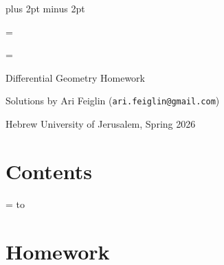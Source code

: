 




\parindent=0pt
\parskip=3pt plus 2pt minus 2pt



\footline={}


\headline={\pagedecor}

{\setboxshadow
\contentbox

    \centerline{Differential Geometry Homework}
    \smallskip
    \centerline{Solutions by Ari Feiglin ({\tt ari.feiglin@gmail.com})}
    \centerline{Hebrew University of Jerusalem, Spring 2026}

\eppbox

\bigskip

\contentbox
    \section*{Contents}
    
    \tableofcontents
\eppbox

}

\vfill\break

\color{black}

\newif\ifpageodd
\pageoddtrue
\headline={%
    \hbox to \hsize{\color{black}%
        \ifpageodd\hfil{\it\currsubsection\quad\bf\folio}\global\pageoddfalse%
        \else{\bf\folio\quad\it\currsubsection}\hfil\global\pageoddtrue\fi%
    }%
}

\def\inputhw#1{%
    \section{Homework #1}%
}
\inputhw

\bye


